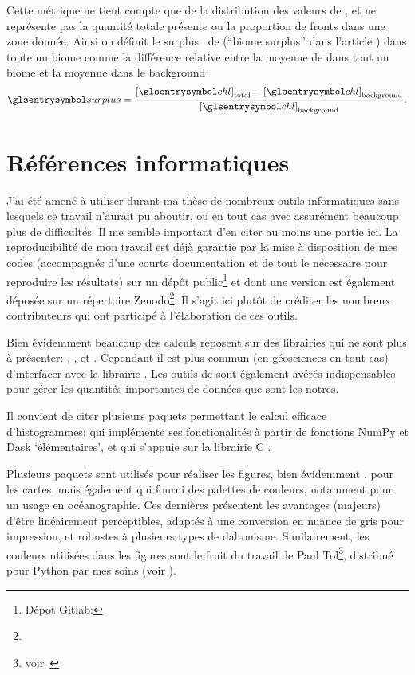 \documentclass[index]{subfiles}
\begin{document}
Cette métrique ne tient compte que de la distribution des valeurs de , et ne représente pas la quantité totale présente ou la proportion de fronts dans une zone donnée.
Ainsi on définit le surplus~ de  (\enquote{biome surplus} dans l'article ) dans toute un biome comme la différence relative entre la moyenne de  dans tout un biome et la moyenne dans le background:
\begin{equation}
  \am{surplus} = \frac{\moy{\am{chl}}_\tot - \moy{\am{chl}}_\bkg}
  {\moy{\am{chl}}_\bkg} .
\end{equation}

\section{Références informatiques}
\label{sec:ref-info}

J'ai été amené à utiliser durant ma thèse de nombreux outils informatiques sans lesquels ce travail n'aurait pu aboutir, ou en tout cas avec assurément beaucoup plus de difficultés.
Il me semble important d'en citer au moins une partie ici.
La reproducibilité de mon travail est déjà garantie par la mise à disposition de mes codes (accompagnés d'une courte documentation et de tout le nécessaire pour reproduire les résultats) sur un dépôt public\footnote{%
  Dépot Gitlab: }
et dont une version est également déposée sur un répertoire Zenodo\footnote{}.
Il s'agit ici plutôt de créditer les nombreux contributeurs qui ont participé à l'élaboration de ces outils.

Bien évidemment beaucoup des calculs reposent sur des librairies qui ne sont plus à présenter: , , et .
Cependant il est plus commun (en géosciences en tout cas) d'interfacer avec la librairie .
Les outils de  sont également avérés indispensables pour gérer les quantités importantes de données que sont les notres.

Il convient de citer plusieurs paquets permettant le calcul efficace d'histogrammes:
 qui implémente ses fonctionalités à partir de fonctions NumPy et Dask \enquote*{élémentaires}, et
 qui s'appuie sur la librairie C .

Plusieurs paquets sont utilisés pour réaliser les figures, bien évidemment ,
 pour les cartes,
mais également  qui fourni des palettes de couleurs, notamment pour un usage en océanographie. Ces dernières présentent les avantages (majeurs) d'être linéairement perceptibles, adaptés à une conversion en nuance de gris pour impression, et robustes à plusieurs types de daltonisme.
Similairement, les couleurs utilisées dans les figures sont le fruit du travail de Paul Tol\footnote{voir~}, distribué pour Python par mes soins (voir ).
\end{document}
